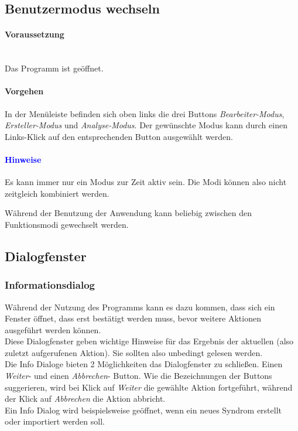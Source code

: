 \documentclass[enabledeprecatedfontcommands,fontsize=11pt,paper=a4,twoside]{scrartcl}
\newcommand*{\bbe}{\textcolor{bbe}}
\newcounter{one}
\newcounter{two}[one]
\newcommand*{\hint}{\paragraph{\textcolor{blue}{Hinweise}}}
\newcommand*{\condition}{\paragraph{Voraussetzung}$\;$ \vspace{0.2cm}\\}
\newcommand*{\action}{\paragraph{Vorgehen}}
\let\tempone\itemize
\let\temptwo\enditemize
\renewenvironment{itemize}{\tempone\addtolength{\itemsep}{-10.0pt}}{\temptwo}
\let\origenumerate\enumerate
\let\origendenumerate\endenumerate
\renewenvironment{enumerate}{\origenumerate \addtolength{\itemsep}{-10.0pt}}{\origendenumerate}
\begin{document}
\newpage
\subsection{Benutzermodus wechseln} \label{mode}
	\condition 
		Das Programm ist geöffnet.
	\action
	\begin{enumerate}
		\item In der Menüleiste befinden sich oben links die drei Buttons \textit{Bearbeiter-Modus}, \textit{Ersteller-Modus} und \textit{Analyse-Modus}. Der gewünschte Modus kann durch einen Links-Klick auf den entsprechenden Button ausgewählt werden.
	\end{enumerate} 
	\hint
	\begin{itemize}
		\item Es kann immer nur ein Modus zur Zeit aktiv sein. Die Modi können also nicht zeitgleich kombiniert werden.
		\item Während der Benutzung der Anwendung kann beliebig zwischen den Funktionsmodi gewechselt werden. \\
\end{itemize}			 
		
\subsection{Dialogfenster} \label{dialog}
\subsubsection{Informationsdialog}
Während der Nutzung des Programms kann es dazu kommen, dass sich ein Fenster öffnet, dass erst bestätigt werden muss, bevor weitere Aktionen ausgeführt werden können. \\
Diese Dialogfenster geben wichtige Hinweise für das Ergebnis der aktuellen (also zuletzt aufgerufenen Aktion). \bbe{Sie sollten also unbedingt gelesen werden.} \\
Die Info Dialoge bieten 2 Möglichkeiten das Dialogfenster zu schließen. Einen \textit{Weiter}- und einen \textit{Abbrechen}- Button. Wie die Bezeichnungen der Buttons suggerieren, wird bei Klick auf \textit{Weiter} die gewählte Aktion fortgeführt, während der Klick auf \textit{Abbrechen} die Aktion abbricht. \\
Ein Info Dialog wird beispielsweise geöffnet, wenn ein neues Syndrom erstellt oder importiert werden soll. \\
\end{document}
